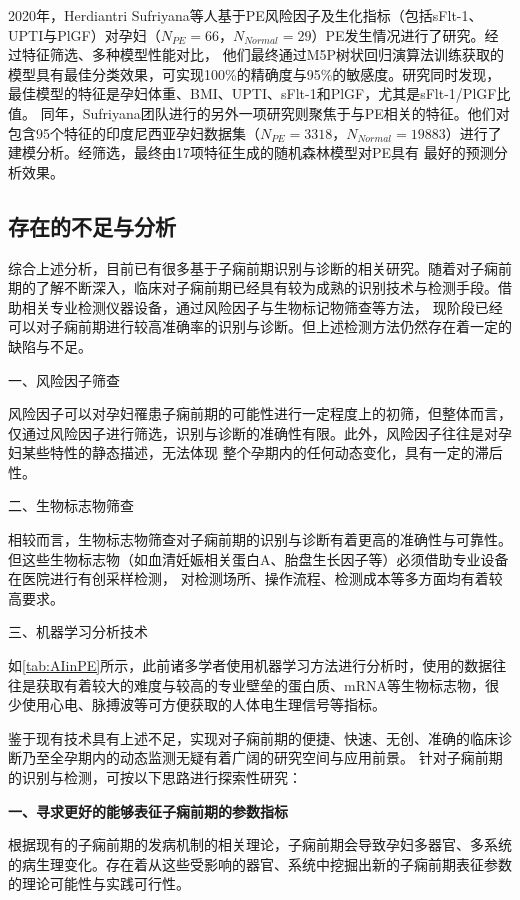 2020年，Herdiantri Sufriyana等人\cite{Sufriyana2020-1}基于PE风险因子及生化指标（包括sFlt-1、UPTI与PlGF）对孕妇（$N_{PE}=66$，$N_{Normal}=29$）PE发生情况进行了研究。经过特征筛选、多种模型性能对比，
他们最终通过M5P树状回归演算法训练获取的模型具有最佳分类效果，可实现100\%的精确度与95\%的敏感度。研究同时发现，最佳模型的特征是孕妇体重、BMI、UPTI、sFlt-1和PlGF，尤其是sFlt-1/PlGF比值。
同年，Sufriyana团队进行的另外一项研究\cite{Sufriyana2020}则聚焦于与PE相关的特征。他们对包含95个特征的印度尼西亚孕妇数据集（$N_{PE}=3318$，$N_{Normal}=19883$）进行了建模分析。经筛选，最终由17项特征生成的随机森林模型对PE具有
最好的预测分析效果。

\subsection{存在的不足与分析}
综合上述分析，目前已有很多基于子痫前期识别与诊断的相关研究。随着对子痫前期的了解不断深入，临床对子痫前期已经具有较为成熟的识别技术与检测手段。借助相关专业检测仪器设备，通过风险因子与生物标记物筛查等方法，
现阶段已经可以对子痫前期进行较高准确率的识别与诊断。但上述检测方法仍然存在着一定的缺陷与不足。

一、风险因子筛查

风险因子可以对孕妇罹患子痫前期的可能性进行一定程度上的初筛，但整体而言，仅通过风险因子进行筛选，识别与诊断的准确性有限。此外，风险因子往往是对孕妇某些特性的静态描述，无法体现
整个孕期内的任何动态变化，具有一定的滞后性。

二、生物标志物筛查

相较而言，生物标志物筛查对子痫前期的识别与诊断有着更高的准确性与可靠性。但这些生物标志物（如血清妊娠相关蛋白A、胎盘生长因子等）必须借助专业设备在医院进行有创采样检测，
对检测场所、操作流程、检测成本等多方面均有着较高要求。

三、机器学习分析技术

如\autoref{tab:AIinPE}所示，此前诸多学者使用机器学习方法进行分析时，使用的数据往往是获取有着较大的难度与较高的专业壁垒的蛋白质、mRNA等生物标志物，很少使用心电、脉搏波等可方便获取的人体电生理信号等指标。

鉴于现有技术具有上述不足，实现对子痫前期的便捷、快速、无创、准确的临床诊断乃至全孕期内的动态监测无疑有着广阔的研究空间与应用前景。
针对子痫前期的识别与检测，可按以下思路进行探索性研究：

\textbf{一、寻求更好的能够表征子痫前期的参数指标}

根据现有的子痫前期的发病机制的相关理论，子痫前期会导致孕妇多器官、多系统的病生理变化。存在着从这些受影响的器官、系统中挖掘出新的子痫前期表征参数的理论可能性与实践可行性。

